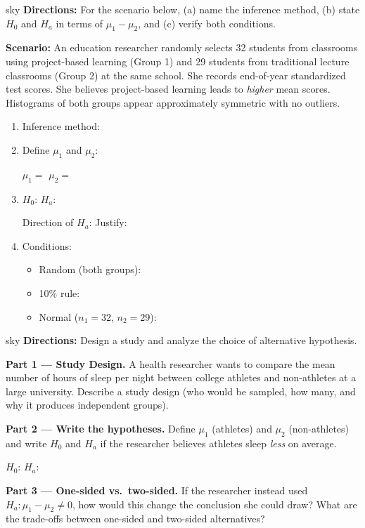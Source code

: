 \documentclass[10pt]{article}
\begin{document}
\begin{scenariobox}{sky}
\textbf{Directions:} For the scenario below, (a) name the inference method, (b) state $H_0$
and $H_a$ in terms of $\mu_1 - \mu_2$, and (c) verify both conditions.

\medskip
\textbf{Scenario:} An education researcher randomly selects 32 students from classrooms using
project-based learning (Group 1) and 29 students from traditional lecture classrooms (Group 2)
at the same school. She records end-of-year standardized test scores. She believes project-based
learning leads to \emph{higher} mean scores. Histograms of both groups appear approximately
symmetric with no outliers.

\begin{enumerate}[label=\alph*.]
  \item Inference method: \blank{5.5cm}
  \item Define $\mu_1$ and $\mu_2$:

        $\mu_1 = $ \blank{6cm} \qquad $\mu_2 = $ \blank{6cm}

  \item $H_0$: \blank{4.5cm} \qquad $H_a$: \blank{4.5cm}

        Direction of $H_a$: \blank{2cm} \quad Justify: \writeline

  \item Conditions:
        \begin{itemize}
          \item Random (both groups): \writeline
          \item 10\% rule: \writeline
          \item Normal ($n_1 = 32$, $n_2 = 29$): \writeline
        \end{itemize}
\end{enumerate}
\end{scenariobox}

\begin{scenariobox}{sky}
\textbf{Directions:} Design a study and analyze the choice of alternative hypothesis.

\medskip
\textbf{Part 1 --- Study Design.} A health researcher wants to compare the mean number of
hours of sleep per night between college athletes and non-athletes at a large university.
Describe a study design (who would be sampled, how many, and why it produces independent groups).

\textbf{Part 2 --- Write the hypotheses.} Define $\mu_1$ (athletes) and $\mu_2$ (non-athletes)
and write $H_0$ and $H_a$ if the researcher believes athletes sleep \emph{less} on average.

$H_0$: \blank{4.5cm} \qquad $H_a$: \blank{4.5cm}

\textbf{Part 3 --- One-sided vs.\ two-sided.} If the researcher instead used $H_a: \mu_1 - \mu_2 \ne 0$,
how would this change the conclusion she could draw? What are the trade-offs between one-sided
and two-sided alternatives?
\end{scenariobox}
\end{document}
